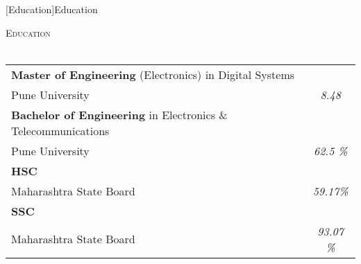 \documentclass[a4paper]{article}
\newcommand{\lineunder} {
    \vspace*{-8pt} \\
    \hspace*{-18pt} \hrulefill \\
}
\newcommand{\header} [1] {
    {\hspace*{-18pt}\vspace*{6pt} \textsc{#1}}
    \vspace*{-6pt} \lineunder
}
\begin{document}
[Education]{Education}
\header{Education}
\vspace{1mm}
\bgroup
\def\arraystretch{1.2}
\begin{tabularx}{\textwidth}{ | X | c | }
  \hline

\textbf{Master of Engineering} (Electronics) in Digital Systems & \\
Pune University & \textit{8.48} \\
  \hline

\textbf{Bachelor of Engineering} in Electronics \& Telecommunications & \\
Pune University & \textit{62.5 \%} \\
  \hline

\textbf{HSC} &\\
Maharashtra State Board & \textit{59.17\%}  \\
  \hline

  \textbf{SSC} & \\
Maharashtra State Board & \textit{93.07 \%} \\
  \hline

\end{tabularx}
\egroup
\vspace{2mm}
\end{document}
